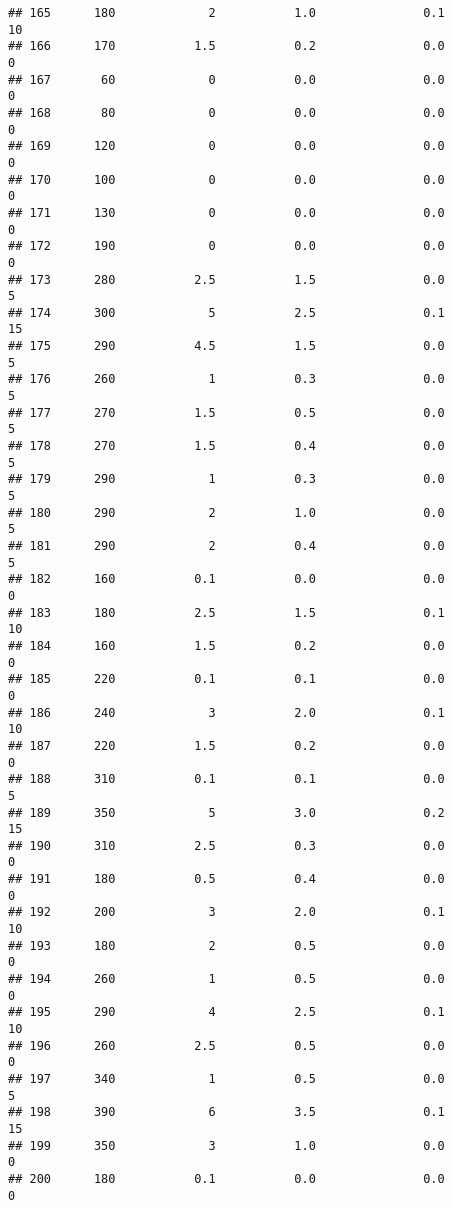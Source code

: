 \documentclass[
]{article}
\begin{document}
\begin{verbatim}
## 165      180             2           1.0               0.1          10
## 166      170           1.5           0.2               0.0           0
## 167       60             0           0.0               0.0           0
## 168       80             0           0.0               0.0           0
## 169      120             0           0.0               0.0           0
## 170      100             0           0.0               0.0           0
## 171      130             0           0.0               0.0           0
## 172      190             0           0.0               0.0           0
## 173      280           2.5           1.5               0.0           5
## 174      300             5           2.5               0.1          15
## 175      290           4.5           1.5               0.0           5
## 176      260             1           0.3               0.0           5
## 177      270           1.5           0.5               0.0           5
## 178      270           1.5           0.4               0.0           5
## 179      290             1           0.3               0.0           5
## 180      290             2           1.0               0.0           5
## 181      290             2           0.4               0.0           5
## 182      160           0.1           0.0               0.0           0
## 183      180           2.5           1.5               0.1          10
## 184      160           1.5           0.2               0.0           0
## 185      220           0.1           0.1               0.0           0
## 186      240             3           2.0               0.1          10
## 187      220           1.5           0.2               0.0           0
## 188      310           0.1           0.1               0.0           5
## 189      350             5           3.0               0.2          15
## 190      310           2.5           0.3               0.0           0
## 191      180           0.5           0.4               0.0           0
## 192      200             3           2.0               0.1          10
## 193      180             2           0.5               0.0           0
## 194      260             1           0.5               0.0           0
## 195      290             4           2.5               0.1          10
## 196      260           2.5           0.5               0.0           0
## 197      340             1           0.5               0.0           5
## 198      390             6           3.5               0.1          15
## 199      350             3           1.0               0.0           0
## 200      180           0.1           0.0               0.0           0

\end{verbatim}
\end{document}

